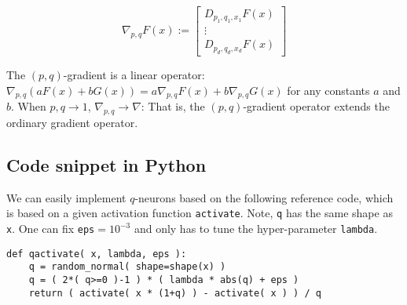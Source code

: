 \documentclass{article}
\begin{document}
$$
\nabla_{p,q} F(x):=\left[
\begin{array}{c}
D_{p_1,q_1,x_1} F(x)\\
\vdots\\
D_{p_d,q_d,x_d} F(x)
\end{array}
\right]
$$

The $(p,q)$-gradient is a linear operator: $\nabla_{p,q} (aF(x)+bG(x))=a \nabla_{p,q}  F(x)+  b \nabla_{p,q}  G(x)$ for any constants $a$ and $b$.
When $p,q\rightarrow 1$, $\nabla_{p,q}\rightarrow \nabla$: That is, the $(p,q)$-gradient operator extends the ordinary gradient operator.

\subsection{Code snippet in Python}\label{sec:pseudocode}

We can easily implement $q$-neurons based on the following reference code,
which is based on a given activation function \texttt{activate}.
Note, \texttt{q} has the same shape as \texttt{x}.
One can fix \texttt{eps}$=10^{-3}$ and
only has to tune the hyper-parameter \texttt{lambda}.

\begin{verbatim}
def qactivate( x, lambda, eps ):
    q = random_normal( shape=shape(x) )
    q = ( 2*( q>=0 )-1 ) * ( lambda * abs(q) + eps )
    return ( activate( x * (1+q) ) - activate( x ) ) / q
\end{verbatim}
\end{document}
